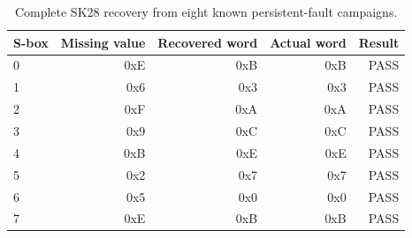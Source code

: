 \begin{table}[t]
\centering
\caption{Complete SK28 recovery from eight known persistent-fault campaigns.}
\label{tab:s1-final-recovery}
\begin{tabular}{lrrrr}
\toprule
S-box & Missing value & Recovered word & Actual word & Result \\
\midrule
0 & 0xE & 0xB & 0xB & PASS \\
1 & 0x6 & 0x3 & 0x3 & PASS \\
2 & 0xF & 0xA & 0xA & PASS \\
3 & 0x9 & 0xC & 0xC & PASS \\
4 & 0xB & 0xE & 0xE & PASS \\
5 & 0x2 & 0x7 & 0x7 & PASS \\
6 & 0x5 & 0x0 & 0x0 & PASS \\
7 & 0xE & 0xB & 0xB & PASS \\
\bottomrule
\end{tabular}
\end{table}
